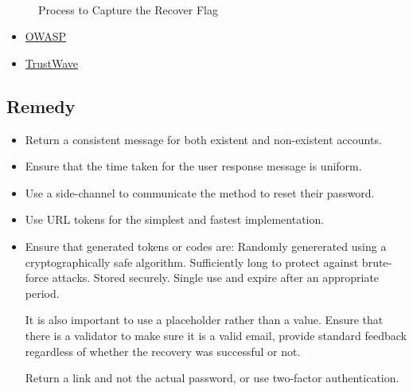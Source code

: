 \begin{figure}[!htb]
     \\
    \caption[Flag 12 Method]{Process to Capture the Recover Flag} %
    \label{fig:flag12 method}
\end{figure}

\begin{itemize}
    \item \href{https://cheatsheetseries.owasp.org/cheatsheets/Forgot_Password_Cheat_Sheet.html}{OWASP}
    \item \href{https://www.trustwave.com/en-us/resources/blogs/spiderlabs-blog/exploiting-password-recovery-functionalities/}{TrustWave}
\end{itemize}

\subsection{Remedy}

\begin{itemize}
    \item Return a consistent message for both existent and non-existent accounts.
    \item Ensure that the time taken for the user response message is uniform.
    \item Use a side-channel to communicate the method to reset their password.
    \item Use URL tokens for the simplest and fastest implementation.
    \item Ensure that generated tokens or codes are:
        \subitem Randomly genererated using a cryptographically safe algorithm.
        \subitem Sufficiently long to protect against brute-force attacks.
        \subitem Stored securely.
        \subitem Single use and expire after an appropriate period.
    
    It is also important to use a placeholder rather than a value. Ensure that there is a validator to make sure it is a valid email, provide standard feedback regardless of whether the recovery was successful or not.
    
    Return a link and not the actual password, or use two-factor authentication.
    
\end{itemize}